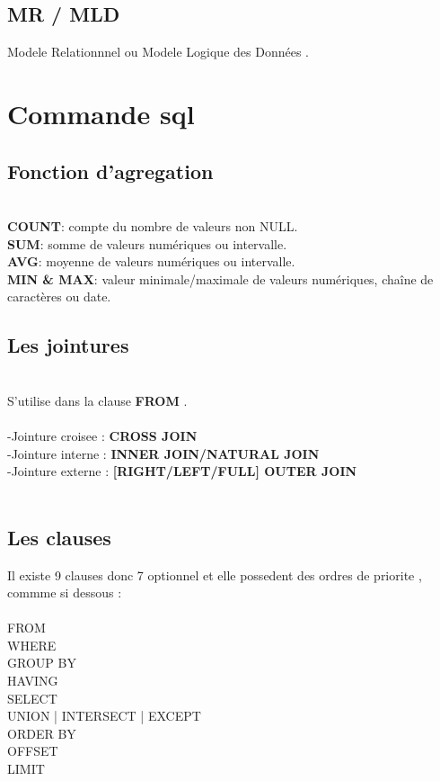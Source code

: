 \documentclass[a4paper,12pt,openany]{book}
\begin{document}
\section{MR / MLD}
Modele Relationnnel ou Modele Logique des Données .\\


\chapter{Commande sql}

\section{Fonction d'agregation}
\\
\textbf{COUNT}: compte du nombre de valeurs non NULL.\\
\textbf{SUM}:  somme de valeurs numériques ou intervalle.\\
\textbf{AVG}:  moyenne de valeurs numériques ou intervalle.\\
\textbf{MIN \& MAX}: valeur minimale/maximale de valeurs numériques, chaîne de caractères ou date.\\

\section{Les jointures}
\\
S'utilise dans la clause \textbf{FROM} .\\
\\
-Jointure croisee : \textbf{CROSS JOIN}\\
-Jointure interne : \textbf{INNER JOIN/NATURAL JOIN}\\
-Jointure externe : \textbf{[RIGHT/LEFT/FULL] OUTER JOIN}\\
\\

\section{Les clauses}
Il existe 9 clauses donc 7 optionnel et elle possedent des ordres de priorite , commme si dessous : \\
\\
FROM\\
WHERE\\
GROUP BY\\
HAVING\\
SELECT\\
{UNION | INTERSECT | EXCEPT}\\
ORDER BY\\
OFFSET\\
LIMIT\\
\end{document}
